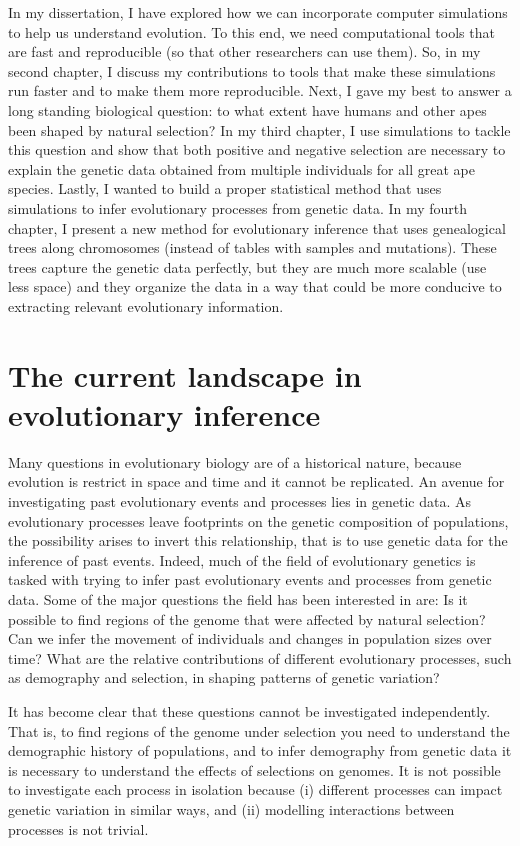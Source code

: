 In my dissertation, I have explored how we can incorporate computer simulations to help us understand evolution.
To this end, we need computational tools that are fast and reproducible (so that other researchers can use them).
So, in my second chapter, I discuss my contributions to tools that make these simulations run faster and to make them more reproducible.
Next, I gave my best to answer a long standing biological question: to what extent have humans and other apes been shaped by natural selection?
In my third chapter, I use simulations to tackle this question and show that both positive and negative selection are necessary to explain the genetic data obtained from multiple individuals for all great ape species.
Lastly, I wanted to build a proper statistical method that uses simulations to infer evolutionary processes from genetic data.
In my fourth chapter, I present a new method for evolutionary inference that uses genealogical trees along chromosomes (instead of tables with samples and mutations).
These trees capture the genetic data perfectly,
but they are much more scalable (use less space) and
they organize the data in a way that could be more conducive to extracting relevant evolutionary information.

\section{The current landscape in evolutionary inference}

Many questions in evolutionary biology are of a historical nature,
because evolution is restrict in space and time and it cannot be replicated.
An avenue for investigating past evolutionary events and processes lies in genetic data.
As evolutionary processes leave footprints on the genetic composition of populations,
the possibility arises to invert this relationship,
that is to use genetic data for the inference of past events.
Indeed, much of the field of evolutionary genetics is tasked with trying to infer past evolutionary events and processes from genetic data.
Some of the major questions the field has been interested in are:
Is it possible to find regions of the genome that were affected by natural selection?
Can we infer the movement of individuals and changes in population sizes over time?
What are the relative contributions of different evolutionary processes, such as demography and selection, in shaping patterns of genetic variation? 


It has become clear that these questions cannot be investigated independently.
That is, to find regions of the genome under selection you need to understand the demographic history of populations,
and to infer demography from genetic data it is necessary to understand the effects of selections on genomes.
It is not possible to investigate each process in isolation because
(i) different processes can impact genetic variation in similar ways,
and (ii) modelling interactions between processes is not trivial.

